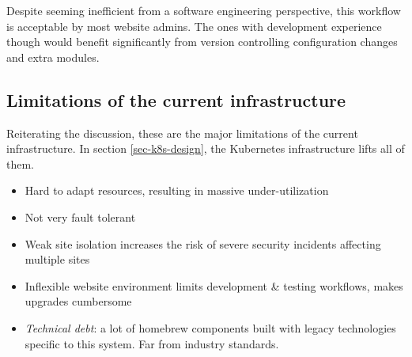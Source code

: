 Despite seeming inefficient from a software engineering perspective, this workflow is acceptable by most website admins.
The ones with development experience though would benefit significantly from version controlling configuration changes and extra modules.

\subsection{Limitations of the current infrastructure}
\label{sec-limitations}

Reiterating the discussion, these are the major limitations of the current infrastructure.
In section \ref{sec-k8s-design}, the Kubernetes infrastructure lifts all of them.

\begin{itemize}
    \item Hard to adapt resources, resulting in massive under-utilization
    \item Not very fault tolerant
    \item Weak site isolation increases the risk of severe security incidents affecting multiple sites
    \item Inflexible website environment limits development \& testing workflows, makes upgrades cumbersome 
    \item \emph{Technical debt}: a lot of homebrew components built with legacy technologies specific to this system.
          Far from industry standards.
\end{itemize}
